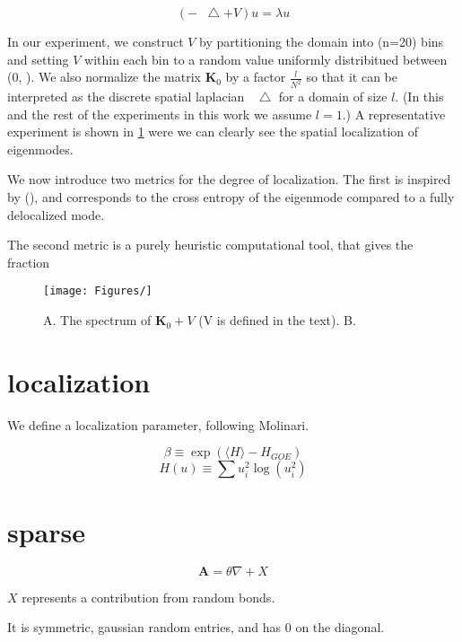 \documentclass{article}
\newcommand*\Laplace{\mathop{}\!\mathbin\bigtriangleup}
\begin{document}
\begin{equation}\label{eq:anderson}
	\left( -\Laplace + V\right)u = \lambda u 
\end{equation}

In our experiment, we construct $V$ by partitioning the domain into (n=20) bins and setting $V$ within each bin to a random value uniformly distribitued between (0, ). 
We also normalize the matrix $\bm{K}_0$ by a factor $\frac{l}{N^2}$ so that it can be interpreted as the discrete spatial laplacian $\Laplace$ for a domain of size $l$. 
(In this and the rest of the experiments in this work we assume $l=1$.) 
A representative experiment is shown in \ref{fig:anderson_eigenvalues} were we can clearly see the spatial localization of eigenmodes.

We now introduce two metrics for the degree of localization. 
The first is inspired by (\cite{Casati1990-ma}), and corresponds to the cross entropy of the eigenmode compared to a fully delocalized mode.

The second metric is a purely heuristic computational tool, that gives the fraction 

\begin{figure}
\begin{center}
\texttt{[image: Figures/]}
\end{center}
\caption{
	A. The spectrum of $\bm{K}_0 + V$ (V is defined in the text). 
	B. 
}
\label{fig:anderson_eigenvalues}
\end{figure}




\section{localization}%
\label{sec:localization}

We define a localization parameter, following Molinari.

\begin{equation}
	\beta \equiv \exp{\left( \langle H \rangle - H_{GOE} \right)}
\end{equation}
\begin{equation}
	H \left( u \right)\equiv \sum u_i ^2 \log{\left( u_i^2 \right)}
\end{equation}

\section{sparse}%
\label{sec:sparse}

\begin{equation}
	\boldsymbol{A} = \theta \nabla + X
\end{equation}

$X$ represents a contribution from random bonds. 

It is symmetric, gaussian random entries, and has 0 on the diagonal.


\end{document}
